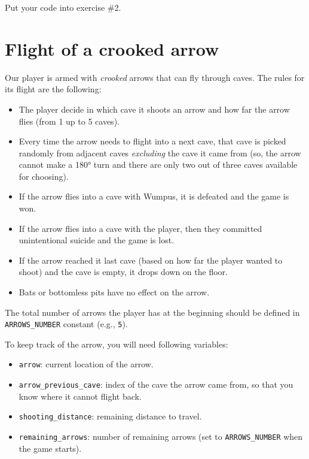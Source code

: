 \documentclass[
]{book}
\providecommand{\tightlist}{%
  \setlength{\itemsep}{0pt}\setlength{\parskip}{0pt}}
\begin{document}
Put your code into exercise \#2.

\hypertarget{flight-of-a-crooked-arrow}{%
\section{Flight of a crooked arrow}\label{flight-of-a-crooked-arrow}}

Our player is armed with \emph{crooked} arrows that can fly through caves. The rules for its flight are the following:

\begin{itemize}
\tightlist
\item
  The player decide in which cave it shoots an arrow and how far the arrow flies (from 1 up to 5 caves).
\item
  Every time the arrow needs to flight into a next cave, that cave is picked randomly from adjacent caves \emph{excluding} the cave it came from (so, the arrow cannot make a 180° turn and there are only two out of three caves available for choosing).
\item
  If the arrow flies into a cave with Wumpus, it is defeated and the game is won.
\item
  If the arrow flies into a cave with the player, then they committed unintentional suicide and the game is lost.
\item
  If the arrow reached it last cave (based on how far the player wanted to shoot) and the cave is empty, it drops down on the floor.
\item
  Bats or bottomless pits have no effect on the arrow.
\end{itemize}

The total number of arrows the player has at the beginning should be defined in \texttt{ARROWS\_NUMBER} constant (e.g., \texttt{5}).

To keep track of the arrow, you will need following variables:

\begin{itemize}
\tightlist
\item
  \texttt{arrow}: current location of the arrow.
\item
  \texttt{arrow\_previous\_cave}: index of the cave the arrow came from, so that you know where it cannot flight back.
\item
  \texttt{shooting\_distance}: remaining distance to travel.
\item
  \texttt{remaining\_arrows}: number of remaining arrows (set to \texttt{ARROWS\_NUMBER} when the game starts).
\end{itemize}
\end{document}
